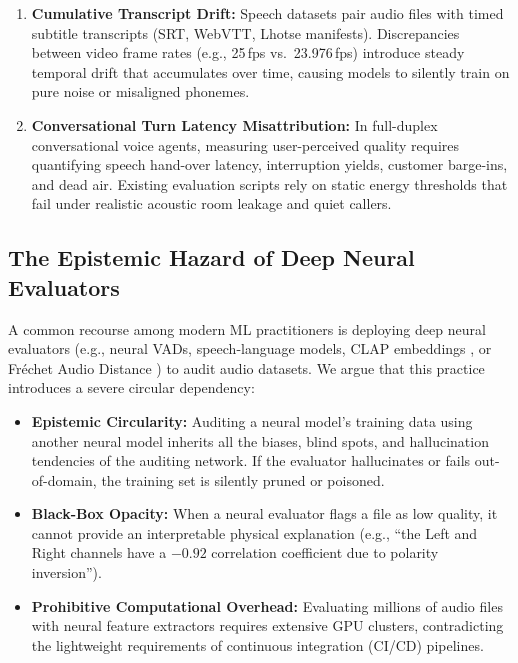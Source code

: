 \documentclass[10pt,journal,compsoc]{IEEEtran}
\begin{document}
\begin{enumerate}
    \item \textbf{Cumulative Transcript Drift:} Speech datasets pair audio files with timed subtitle transcripts (SRT, WebVTT, Lhotse manifests). Discrepancies between video frame rates (e.g., 25\,fps vs.\ 23.976\,fps) introduce steady temporal drift that accumulates over time, causing models to silently train on pure noise or misaligned phonemes.
    \item \textbf{Conversational Turn Latency Misattribution:} In full-duplex conversational voice agents, measuring user-perceived quality requires quantifying speech hand-over latency, interruption yields, customer barge-ins, and dead air. Existing evaluation scripts rely on static energy thresholds that fail under realistic acoustic room leakage and quiet callers.
\end{enumerate}

\subsection{The Epistemic Hazard of Deep Neural Evaluators}
A common recourse among modern ML practitioners is deploying deep neural evaluators (e.g., neural VADs, speech-language models, CLAP embeddings \cite{elizalde2023clap}, or Fr\'echet Audio Distance \cite{kilgour2019frechet}) to audit audio datasets. We argue that this practice introduces a severe circular dependency:
\begin{itemize}
    \item \textbf{Epistemic Circularity:} Auditing a neural model's training data using another neural model inherits all the biases, blind spots, and hallucination tendencies of the auditing network. If the evaluator hallucinates or fails out-of-domain, the training set is silently pruned or poisoned.
    \item \textbf{Black-Box Opacity:} When a neural evaluator flags a file as low quality, it cannot provide an interpretable physical explanation (e.g., ``the Left and Right channels have a $-0.92$ correlation coefficient due to polarity inversion'').
    \item \textbf{Prohibitive Computational Overhead:} Evaluating millions of audio files with neural feature extractors requires extensive GPU clusters, contradicting the lightweight requirements of continuous integration (CI/CD) pipelines.
\end{itemize}
\end{document}
